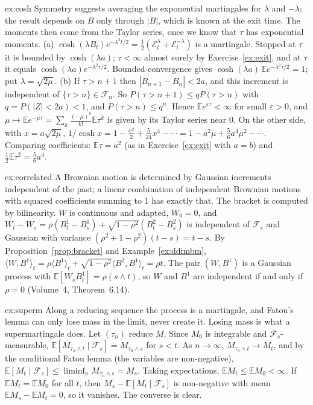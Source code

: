 \begin{solution}{ex:cosh}
\idea Symmetry suggests averaging the exponential martingales for $\lambda$ and $-\lambda$; the result depends on $B$ only through $|B|$, which is known at the exit time. The moments then come from the Taylor
series, once we know that $\tau$ has exponential moments.
\writeup (a) $\cosh(\lambda B_t)e^{-\lambda^2t/2}=\frac12(\mathcal E^\lambda_t+\mathcal E^{-\lambda}_t)$ is a martingale. Stopped at $\tau$ it is bounded by $\cosh(\lambda a)$; $\tau<\infty$ almost surely by Exercise~\ref{ex:exit}, and at
$\tau$ it equals $\cosh(\lambda a)e^{-\lambda^2\tau/2}$. Bounded convergence gives $\cosh(\lambda a)\,\mathbb Ee^{-\lambda^2\tau/2}=1$; put $\lambda=\sqrt{2\mu}$.
(b) If $\tau>n+1$ then $|B_{n+1}-B_n|<2a$, and this increment is independent of $\{\tau>n\}\in\mathcal F_n$. So $P(\tau>n+1)\le qP(\tau>n)$ with $q=P(|Z|<2a)<1$, and $P(\tau>n)\le q^n$. Hence
$\mathbb Ee^{\varepsilon\tau}<\infty$ for small $\varepsilon>0$, and $\mu\mapsto\mathbb Ee^{-\mu\tau}=\sum_k\frac{(-\mu)^k}{k!}\mathbb E\tau^k$ is given by its Taylor series near $0$. On the other side, with $x=a\sqrt{2\mu}$,
$1/\cosh x=1-\frac{x^2}2+\frac5{24}x^4-\cdots=1-a^2\mu+\frac56a^4\mu^2-\cdots$. Comparing coefficients: $\mathbb E\tau=a^2$ (as in Exercise~\ref{ex:exit} with $a=b$) and $\frac12\mathbb E\tau^2=\frac56a^4$.
\end{solution}

\begin{solution}{ex:correlated}
\idea A Brownian motion is determined by Gaussian increments independent of the past; a linear combination of independent Brownian motions with squared coefficients summing to $1$ has exactly that. The
bracket is computed by bilinearity.
\writeup $W$ is continuous and adapted, $W_0=0$, and $W_t-W_s=\rho(B^1_t-B^1_s)+\sqrt{1-\rho^2}(B^2_t-B^2_s)$ is independent of $\mathcal F_s$ and Gaussian with variance $(\rho^2+1-\rho^2)(t-s)=t-s$. By Proposition~\ref{prop:bracket}
and Example~\ref{ex:ddimbm}, $\langle W,B^1\rangle_t=\rho\langle B^1\rangle_t+\sqrt{1-\rho^2}\langle B^2,B^1\rangle_t=\rho t$. The pair $(W,B^1)$ is a Gaussian process with $\mathbb E[W_sB^1_t]=\rho(s\wedge t)$, so
$W$ and $B^1$ are independent if and only if $\rho=0$ (Volume~4, Theorem~6.14).
\end{solution}

\begin{solution}{ex:superm}
\idea Along a reducing sequence the process is a martingale, and Fatou's lemma can only lose mass in the limit, never create it. Losing mass is what a supermartingale does.
\writeup Let $(\tau_n)$ reduce $M$. Since $M_0$ is integrable and $\mathcal F_s$-measurable, $\mathbb E[M_{\tau_n\wedge t}\mid\mathcal F_s]=M_{\tau_n\wedge s}$ for $s<t$. As $n\to\infty$, $M_{\tau_n\wedge t}\to M_t$, and by the
conditional Fatou lemma (the variables are non-negative), $\mathbb E[M_t\mid\mathcal F_s]\le\liminf_nM_{\tau_n\wedge s}=M_s$. Taking expectations, $\mathbb EM_t\le\mathbb EM_0<\infty$. If $\mathbb EM_t=\mathbb EM_0$ for all $t$,
then $M_s-\mathbb E[M_t\mid\mathcal F_s]$ is non-negative with mean $\mathbb EM_s-\mathbb EM_t=0$, so it vanishes. The converse is clear.
\end{solution}

